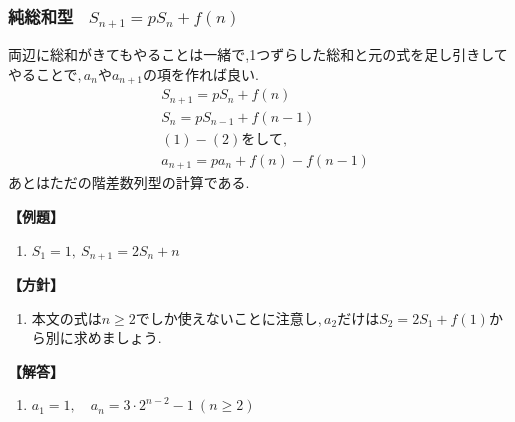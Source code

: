 \documentclass[dvipdfmx,a4paper,11pt,fleqn,openany]{jsbook}
\begin{document}
    \subsubsection{純総和型 \, $S_{n+1}=pS_n+f(n) $}
      両辺に総和がきてもやることは一緒で,1つずらした総和と元の式を足し引きしてやることで,\,$a_n$や$a_{n+1}$の項を作れば良い.
      \begin{align*}
        &S_{n+1}=pS_n+f(n) \tag{1}\\
        &S_{n}=pS_{n-1}+f(n-1) \tag{2}\\
        &\text{$(1)-(2)$をして,}\\
        &a_{n+1}=pa_{n}+f(n)-f(n-1)
      \end{align*}
      あとはただの階差数列型の計算である.

      \noindent \textbf{【例題】}
      \begin{enumerate}[label=(\arabic*),parsep=3pt]
        \item $\displaystyle S_1=1,\ S_{n+1}=2S_n+n$
      \end{enumerate}

      \noindent\textbf{【方針】}
      \begin{enumerate}[label=(\arabic*),parsep=3pt]
        \item 本文の式は$n\ge2$でしか使えないことに注意し,\,$a_2$だけは$S_2=2S_1+f(1)$から別に求めましょう.
      \end{enumerate}

      \noindent\textbf{【解答】}
      \begin{enumerate}[label=(\arabic*),parsep=3pt]
        \item $\displaystyle a_1=1,\quad a_n=3\cdot2^{n-2}-1\ (n\ge2)$
      \end{enumerate}
\end{document}
